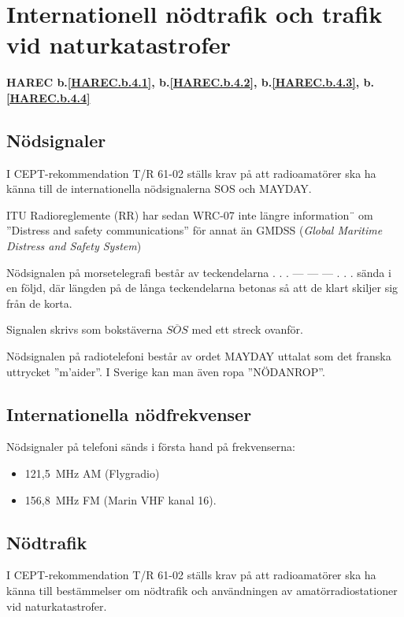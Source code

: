 \section{Internationell nödtrafik och trafik vid naturkatastrofer}
\textbf{
	HAREC b.\ref{HAREC.b.4.1}\label{myHAREC.b.4.1},
	b.\ref{HAREC.b.4.2}\label{myHAREC.b.4.2},
	b.\ref{HAREC.b.4.3}\label{myHAREC.b.4.3},
	b.\ref{HAREC.b.4.4}\label{myHAREC.b.4.4}
}

\subsection{Nödsignaler}

I CEPT-rekommendation T/R 61-02 \cite{TR6102} ställs krav på att radioamatörer
ska ha känna till de internationella nödsignalerna SOS och MAYDAY.

ITU Radioreglemente (RR) \cite{ITU-RR} har sedan WRC-07 inte längre information¨
om ''Distress and safety communications'' för annat än
GMDSS (\emph{Global Maritime Distress and Safety System})

Nödsignalen på morsetelegrafi består av teckendelarna . . . --- --- --- . . .
sända i en följd, där längden på de långa teckendelarna betonas så att de klart
skiljer sig från de korta.

Signalen skrivs som bokstäverna $\overline{SOS}$ med ett streck ovanför.

Nödsignalen på radiotelefoni består av ordet MAYDAY uttalat som det franska
uttrycket ''m'aider''. I Sverige kan man även ropa ''NÖDANROP''.

\subsection{Internationella nödfrekvenser}

Nödsignaler på telefoni sänds i första hand på frekvenserna:
\begin{itemize}
	\item 121,5~MHz AM (Flygradio)
	\item 156,8~MHz FM (Marin VHF kanal 16).
\end{itemize}

\subsection{Nödtrafik}

I CEPT-rekommendation T/R 61-02 \cite{TR6102} ställs krav på att radioamatörer
ska ha känna till bestämmelser om nödtrafik och användningen av
amatörradiostationer vid naturkatastrofer.


